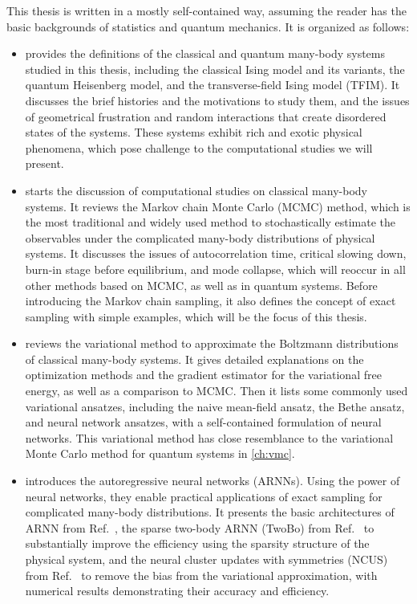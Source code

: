 This thesis is written in a mostly self-contained way, assuming the reader has the basic backgrounds of statistics and quantum mechanics. It is organized as follows:
\begin{itemize}
\item {} provides the definitions of the classical and quantum many-body systems studied in this thesis, including the classical Ising model and its variants, the quantum Heisenberg model, and the transverse-field Ising model (TFIM).
It discusses the brief histories and the motivations to study them, and the issues of geometrical frustration and random interactions that create disordered states of the systems. These systems exhibit rich and exotic physical phenomena, which pose challenge to the computational studies we will present.
\item {} starts the discussion of computational studies on classical many-body systems. It reviews the Markov chain Monte Carlo (MCMC) method, which is the most traditional and widely used method to stochastically estimate the observables under the complicated many-body distributions of physical systems.
It discusses the issues of autocorrelation time, critical slowing down, burn-in stage before equilibrium, and mode collapse, which will reoccur in all other methods based on MCMC, as well as in quantum systems.
Before introducing the Markov chain sampling, it also defines the concept of exact sampling with simple examples, which will be the focus of this thesis.
\item {} reviews the variational method to approximate the Boltzmann distributions of classical many-body systems.
It gives detailed explanations on the optimization methods and the gradient estimator for the variational free energy, as well as a comparison to MCMC.
Then it lists some commonly used variational ansatzes, including the naive mean-field ansatz, the Bethe ansatz, and neural network ansatzes, with a self-contained formulation of neural networks.
This variational method has close resemblance to the variational Monte Carlo method for quantum
systems in \cref{ch:vmc}.
\item {} introduces the autoregressive neural networks (ARNNs). Using the power of neural networks, they enable practical applications of exact sampling for complicated many-body distributions.
It presents the basic architectures of ARNN from Ref.~\cite{wu2019solving}, the sparse two-body ARNN (TwoBo) from Ref.~\cite{biazzo2024sparse} to substantially improve the efficiency using the sparsity structure of the physical system, and the neural cluster updates with symmetries (NCUS) from Ref.~\cite{wu2021unbiased} to remove the bias from the variational approximation, with numerical results demonstrating their accuracy and efficiency.

\end{itemize}
